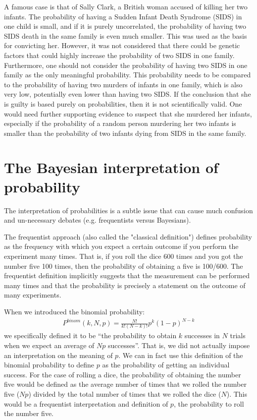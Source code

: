 A famous case is that of Sally Clark, a British woman accused of killing her two infants. The probability of having a Sudden Infant Death Syndrome (SIDS) in one child is small, and if it is purely uncorrelated, the probability of having two SIDS death in the same family is even much smaller.  This was used as the basis for convicting her. However, it was not considered that there could be genetic factors that could highly increase the probability of two SIDS in one family. Furthermore, one should not consider the probability of having two SIDS in one family as the only meaningful probability. This probability needs to be compared to the probability of having two murders of infants in one family, which is also very low, potentially even lower than having two SIDS. If the conclusion that she is guilty is based purely on probabilities, then it is not scientifically valid. One would need further supporting evidence to suspect that she murdered her infants, especially if the probability of a random person murdering her two infants is smaller than the probability of two infants dying from SIDS in the same family.


\section{The Bayesian interpretation of probability}
The interpretation of probabilities is a subtle issue that can cause much confusion and un-necessary debates (e.g. frequentists versus Bayesians).

The frequentist approach (also called the "classical definition") defines probability as the frequency with which you expect a certain outcome if you perform the experiment many times. That is, if you roll the dice 600 times and you got the number five 100 times, then the probability of obtaining a five is 100/600. The frequentist definition implicitly suggests that the measurement can be performed many times and that the probability is precisely a statement on the outcome of many experiments.

When we introduced the binomial probability:
\begin{align}
P^{binom}(k,N,p)=\frac{N!}{k!(N-k)!}p^k(1-p)^{N-k}
\end{align}
we specifically defined it to be ``the probability to obtain $k$ successes in $N$ trials when we expect an average of $Np$ successes''. That is, we did not actually impose an interpretation on the meaning of $p$. We can in fact use this definition of the binomial probability to define  $p$ as the probability of getting an individual success. For the case of rolling a dice, the probability of obtaining the number five would be defined as the average number of times that we rolled the number five ($Np$) divided by the total number of times that we rolled the dice ($N$). This would be a frequentist interpretation and definition of $p$, the probability to roll the number five.

